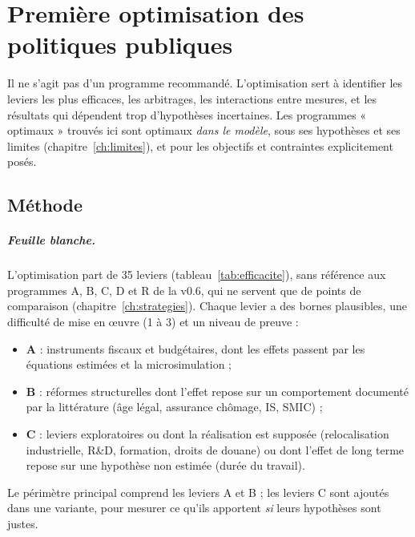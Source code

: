 \chapter{Première optimisation des politiques publiques}\label{ch:optimisation}

\begin{hypothese}
Il ne s'agit pas d'un programme recommandé. L'optimisation sert à identifier les leviers les plus efficaces, les
arbitrages, les interactions entre mesures, et les résultats qui dépendent trop d'hypothèses incertaines. Les
programmes « optimaux » trouvés ici sont optimaux \emph{dans le modèle}, sous ses hypothèses et ses limites
(chapitre~\ref{ch:limites}), et pour les objectifs et contraintes explicitement posés.
\end{hypothese}

\section{Méthode}

\paragraph{Feuille blanche.} L'optimisation part de 35 leviers (tableau~\ref{tab:efficacite}), sans référence aux
programmes A, B, C, D et R de la v0.6, qui ne servent que de points de comparaison (chapitre~\ref{ch:strategies}).
Chaque levier a des bornes plausibles, une difficulté de mise en œuvre (1 à 3) et un niveau de preuve :
\begin{itemize}
\item \textbf{A} : instruments fiscaux et budgétaires, dont les effets passent par les équations estimées et la
microsimulation ;
\item \textbf{B} : réformes structurelles dont l'effet repose sur un comportement documenté par la littérature (âge
légal, assurance chômage, IS, SMIC) ;
\item \textbf{C} : leviers exploratoires ou dont la réalisation est supposée (relocalisation industrielle, R\&D,
formation, droits de douane) ou dont l'effet de long terme repose sur une hypothèse non estimée (durée du travail).
\end{itemize}
Le périmètre principal comprend les leviers A et B ; les leviers C sont ajoutés dans une variante, pour mesurer ce
qu'ils apportent \emph{si} leurs hypothèses sont justes.

